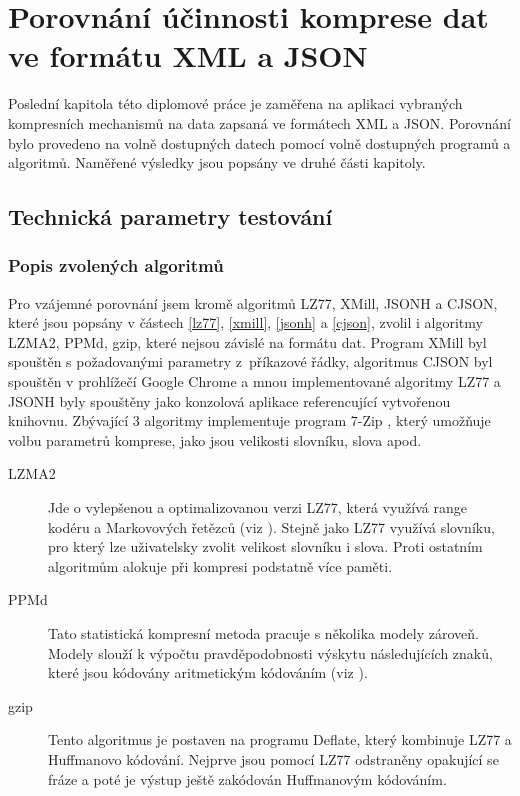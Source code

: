 \chapter{Porovnání účinnosti komprese dat ve formátu XML a JSON}
\label{kapitolaPorovnaniUcinnosti}
Poslední kapitola této diplomové práce je zaměřena na aplikaci vybraných kompresních mechanismů na data zapsaná ve formátech XML a JSON. Porovnání bylo provedeno na volně dostupných datech pomocí volně dostupných programů a algoritmů. Naměřené výsledky jsou popsány ve druhé části kapitoly.

\section{Technická parametry testování}

\subsection{Popis zvolených algoritmů}
Pro vzájemné porovnání jsem kromě algoritmů LZ77, XMill, JSONH a CJSON, které jsou popsány v částech \ref{lz77}, \ref{xmill}, \ref{jsonh} a \ref{cjson}, zvolil i algoritmy LZMA2, PPMd, gzip, které nejsou závislé na formátu dat. Program XMill byl spouštěn s požadovanými parametry z~příkazové řádky, algoritmus CJSON byl spouštěn v prohlížečí Google Chrome a mnou implementované algoritmy LZ77 a JSONH byly spouštěny jako konzolová aplikace referencující vytvořenou knihovnu. Zbývající 3 algoritmy implementuje program 7-Zip \cite{7zip}, který umožňuje volbu parametrů komprese, jako jsou velikosti slovníku, slova apod.

\begin{description}
\item[LZMA2] Jde o vylepšenou a optimalizovanou verzi LZ77, která využívá range kodéru a Markovových řetězců (viz \cite{introductionToDataCompression}). Stejně jako LZ77 využívá slovníku, pro který lze uživatelsky zvolit velikost slovníku i slova. Proti ostatním algoritmům alokuje při kompresi podstatně více paměti.
\item[PPMd] Tato statistická kompresní metoda pracuje s několika modely zároveň. Modely slouží k výpočtu pravděpodobnosti výskytu následujících znaků, které jsou kódovány aritmetickým kódováním (viz \cite{introductionToDataCompression}).
\item[gzip] Tento algoritmus je postaven na programu Deflate, který kombinuje LZ77 a Huffmanovo kódování. Nejprve jsou pomocí LZ77 odstraněny opakující se fráze a poté je výstup ještě zakódován Huffmanovým kódováním. 
\end{description}

